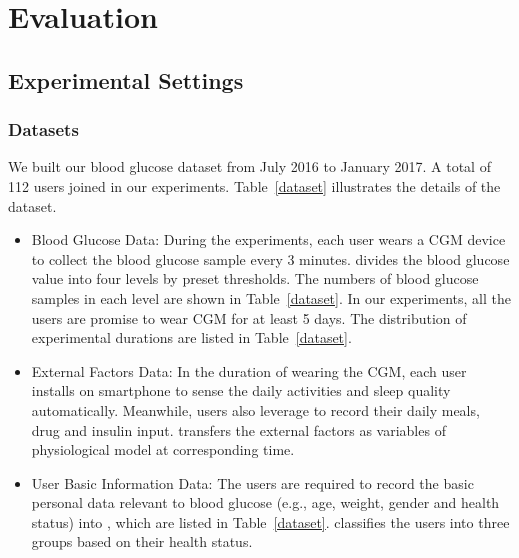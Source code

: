 \section{Evaluation}
\label{sec:eval}
\subsection{Experimental Settings}
\subsubsection{Datasets}
We built our blood glucose dataset from July 2016 to January 2017. A total of 112 users joined in our experiments. Table~\ref{dataset} illustrates the details of the dataset.
\begin{itemize}
  \item Blood Glucose Data: During the experiments, each user wears a CGM device to collect the blood glucose sample every 3 minutes. \sysname divides the blood glucose value into four levels by preset thresholds. The numbers of blood glucose samples in each level are shown in Table~\ref{dataset}. In our experiments, all the users are promise to wear CGM for at least 5 days. The distribution of experimental durations are listed in Table~\ref{dataset}.
  \item External Factors Data: In the duration of wearing the CGM, each user installs \sysname on smartphone to sense the daily activities and sleep quality automatically. Meanwhile, users also leverage \sysname to record their daily meals, drug and insulin input. \sysname transfers the external factors as variables of physiological model at corresponding time.
  \item User Basic Information Data: The users are required to record the basic personal data relevant to blood glucose (e.g., age, weight, gender and health status) into \sysname, which are listed in Table~\ref{dataset}. \sysname classifies the users into three groups based on their health status.

\end{itemize}





